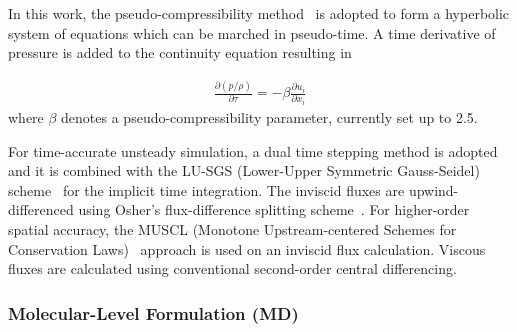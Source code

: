 \documentclass[preprint,12pt]{elsarticle}
\begin{document}
In this work, the pseudo-compressibility method~\cite{PseudoCompressibility} is adopted to form a hyperbolic system of equations which can be marched in pseudo-time.
A time derivative of pressure is added to the continuity equation resulting in

\vspace{-.2em}
\begin{eqnarray}
\frac{\partial (p/\rho)}{\partial \tau} = - \beta \frac{\partial {u}_{i}}{\partial {x}_{i}}
\end{eqnarray}
where $\beta$ denotes a pseudo-compressibility parameter, currently set up to 2.5.

For time-accurate unsteady simulation, a dual time stepping method is adopted and it is combined with the LU-SGS (Lower-Upper Symmetric Gauss-Seidel) scheme~\cite{LU-SGS} for the implicit time integration. The inviscid fluxes are upwind-differenced using Osher's flux-difference splitting scheme~\cite{Osher}. For higher-order spatial accuracy, the MUSCL (Monotone Upstream-centered Schemes for Conservation Laws)~\cite{MUSCL} approach is used on an inviscid flux calculation. Viscous fluxes are calculated using conventional second-order central differencing.


\subsubsection{Molecular-Level Formulation (MD)}



\end{document}
